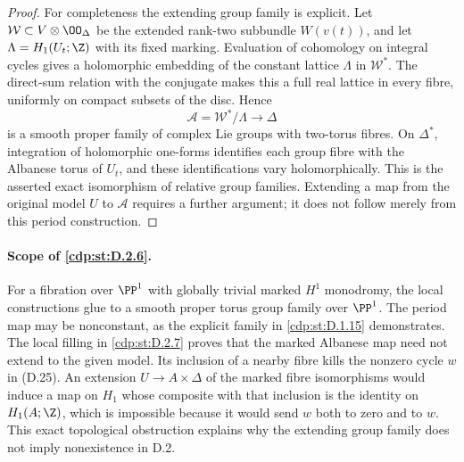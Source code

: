 \begin{proof}
For completeness the extending group family is explicit.
Let $\mathcal W\subset V\otimes\OO_\Delta$ be the extended
rank-two subbundle $W(v(t))$, and let
$\Lambda=H_1(U_t;\Z)$ with its fixed marking. Evaluation of
cohomology on integral cycles gives a holomorphic embedding
of the constant lattice $\Lambda$ in $\mathcal W^*$.
The direct-sum relation with the conjugate makes this a full
real lattice in every fibre, uniformly on compact subsets of
the disc. Hence
\[
 \mathcal A=\mathcal W^*/\Lambda\longrightarrow\Delta
\]
is a smooth proper family of complex Lie groups with
two-torus fibres. On $\Delta^*$, integration of holomorphic
one-forms identifies each group fibre with the Albanese torus
of $U_t$, and these identifications vary holomorphically.
This is the asserted exact isomorphism of relative group
families. Extending a map from the original model $U$ to
$\mathcal A$ requires a further argument; it does not follow
merely from this period construction.
\end{proof}

\paragraph{Scope of \ref{cdp:st:D.2.6}.}
For a fibration over $\PP^1$ with globally trivial marked
$H^1$ monodromy, the local constructions glue to a smooth
proper torus group family over $\PP^1$. The period map may
be nonconstant, as the explicit family in \ref{cdp:st:D.1.15} demonstrates.
The local filling in \ref{cdp:st:D.2.7} proves that the marked Albanese
map need not extend to the given model. Its inclusion of
a nearby fibre kills the nonzero cycle $w$ in (D.25).
An extension $U\to A\times\Delta$ of the marked fibre
isomorphisms would induce a map on $H_1$ whose composite
with that inclusion is the identity on $H_1(A;\Z)$,
which is impossible because it would send $w$ both to
zero and to $w$. This exact topological obstruction
explains why the extending group family does not imply
nonexistence in D.2.



